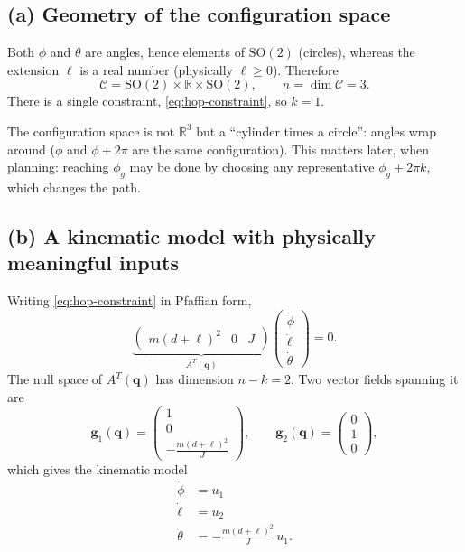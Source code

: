 \documentclass[11pt,a4paper]{article}
\theoremstyle{definition}
\theoremstyle{plain}
\theoremstyle{remark}
\newcommand{\R}{\mathbb{R}}
\newcommand{\q}{\boldsymbol{q}}
\newcommand{\g}{\boldsymbol{g}}
\newcommand{\SO}{\mathrm{SO}}
\begin{document}
\subsection{(a) Geometry of the configuration space}

Both $\phi$ and $\theta$ are angles, hence elements of $\SO(2)$ (circles), whereas the extension $\ell$ is a real number (physically $\ell\ge0$). Therefore
\[
  \mathcal C=\SO(2)\times\R\times\SO(2),\qquad n=\dim\mathcal C=3 .
\]
There is a single constraint, \eqref{eq:hop-constraint}, so $k=1$.

\begin{intuition}
The configuration space is not $\R^3$ but a ``cylinder times a circle'': angles wrap around ($\phi$ and $\phi+2\pi$ are the same configuration). This matters later, when planning: reaching $\phi_g$ may be done by choosing any representative $\phi_g+2\pi k$, which changes the path.
\end{intuition}

\subsection{(b) A kinematic model with physically meaningful inputs}

Writing \eqref{eq:hop-constraint} in Pfaffian form,
\begin{equation}
  \underbrace{\begin{pmatrix} m(d+\ell)^2 & 0 & J\end{pmatrix}}_{A^T(\q)}
  \begin{pmatrix}\dot\phi\\ \dot\ell\\ \dot\theta\end{pmatrix}=0 .
\end{equation}
The null space of $A^T(\q)$ has dimension $n-k=2$. Two vector fields spanning it are
\begin{equation}
  \g_1(\q)=\begin{pmatrix}1\\0\\ -\frac{m(d+\ell)^2}{J}\end{pmatrix},\qquad
  \g_2(\q)=\begin{pmatrix}0\\1\\0\end{pmatrix},
\end{equation}
which gives the kinematic model
\begin{equation}
\boxed{\;
\begin{aligned}
  \dot\phi&=u_1\\
  \dot\ell&=u_2\\
  \dot\theta&=-\frac{m(d+\ell)^2}{J}\,u_1 .
\end{aligned}\;}
\label{eq:hop-km}
\end{equation}
\end{document}
